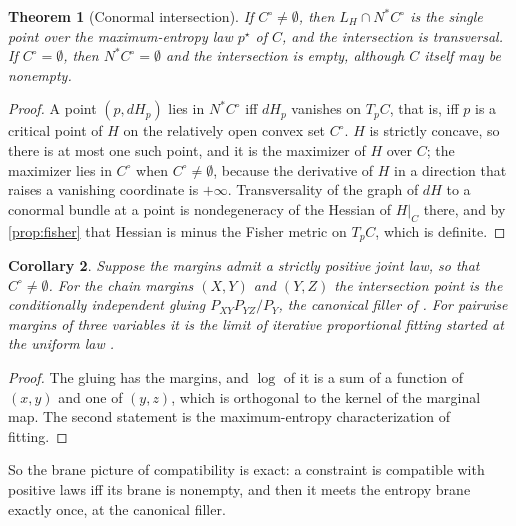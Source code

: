 \documentclass[11pt]{article}
\newtheorem{theorem}{Theorem}[section]
\newtheorem{corollary}[theorem]{Corollary}
\theoremstyle{definition}
\theoremstyle{remark}
\begin{document}
\begin{theorem}[Conormal intersection]\label{thm:conormal}
If $C^\circ\neq\emptyset$, then $L_H\cap N^*C^\circ$ is the single point over the maximum-entropy law $p^\star$ of $C$, and the
intersection is transversal. If $C^\circ=\emptyset$, then $N^*C^\circ=\emptyset$ and the intersection is empty, although $C$ itself may
be nonempty.
\end{theorem}
\begin{proof}
A point $(p,dH_p)$ lies in $N^*C^\circ$ iff $dH_p$ vanishes on $T_pC$, that is, iff $p$ is a critical point of $H$ on the
relatively open convex set $C^\circ$. $H$ is strictly concave, so there is at most one such point, and it is the maximizer of $H$
over $C$; the maximizer lies in $C^\circ$ when $C^\circ\ne\emptyset$, because the derivative of $H$ in a direction that raises a
vanishing coordinate is $+\infty$. Transversality of the graph of $dH$ to a conormal bundle at a point is nondegeneracy of the
Hessian of $H\vert_C$ there, and by \cref{prop:fisher} that Hessian is minus the Fisher metric on $T_pC$, which is definite.
\end{proof}

\begin{corollary}\label{cor:filler}
Suppose the margins admit a strictly positive joint law, so that $C^\circ\ne\emptyset$. For the chain margins $(X,Y)$ and $(Y,Z)$ the intersection point is the conditionally independent gluing
$P_{XY}P_{YZ}/P_Y$, the canonical filler of \cite[Thm.~4.2]{Conditionals}. For pairwise margins of three variables it is the
limit of iterative proportional fitting started at the uniform law \cite{Csiszar1975}.
\end{corollary}
\begin{proof}
The gluing has the margins, and $\log$ of it is a sum of a function of $(x,y)$ and one of $(y,z)$, which is orthogonal to the
kernel of the marginal map. The second statement is the maximum-entropy characterization of fitting.
\end{proof}

So the brane picture of compatibility is exact: a constraint is compatible with positive laws iff its brane is nonempty, and
then it meets the entropy brane exactly once, at the canonical filler.
\end{document}
